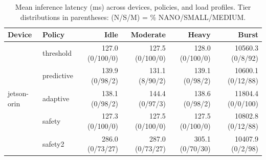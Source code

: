 \begin{table}[t]
\centering
\caption{Mean inference latency (ms) across devices, policies, and load profiles. Tier distributions in parentheses: (N/S/M) = \% NANO/SMALL/MEDIUM.}
\label{tab:multidevice}
\begin{tabular}{llrrrr}
\toprule
Device & Policy & Idle & Moderate & Heavy & Burst \\
\midrule
\multirow{5}{*}{jetson-orin} & threshold & 127.0 (0/100/0) & 127.5 (0/100/0) & 128.0 (0/100/0) & 10560.3 (0/8/92) \\
 & predictive & 139.9 (0/98/2) & 131.1 (8/90/2) & 139.1 (0/98/2) & 10600.1 (0/12/88) \\
 & adaptive & 138.1 (0/98/2) & 144.4 (0/97/3) & 138.6 (0/98/2) & 11804.4 (0/0/100) \\
 & safety & 127.3 (0/100/0) & 127.5 (0/100/0) & 127.5 (0/100/0) & 10802.8 (0/12/88) \\
 & safety2 & 286.0 (0/73/27) & 287.0 (0/73/27) & 305.1 (0/70/30) & 10407.9 (0/2/98) \\
\bottomrule
\end{tabular}
\end{table}